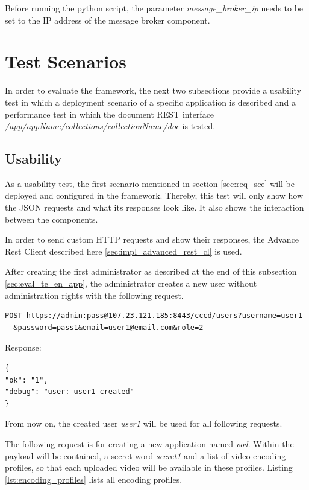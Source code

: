 Before running the python script, the parameter \textit{message\_broker\_ip} needs to be set to the IP address of the message broker component.

\section{Test Scenarios\label{sec:eval__te_sc}}
In order to evaluate the framework, the next two subsections provide a usability test in which a deployment scenario of a specific application is described and a performance test in which the document REST interface \textit{/app/{appName}/collections/{collectionName}/doc} is tested.

\subsection{Usability\label{seq:eval_usab}}
As a usability test, the first scenario mentioned in section \ref{sec:req_sce} will be deployed and configured in the framework. Thereby, this test will only show how the \ac{JSON} requests and what its responses look like. It also shows the interaction between the components.

In order to send custom \ac{HTTP} requests and show their responses, the Advance Rest Client described here \ref{sec:impl_advanced_rest_cl} is used.

After creating the first administrator as described at the end of this subsection \ref{sec:eval_te_en_app}, the administrator creates a new user without administration rights with the following request.
\begin{code}
\begin{verbatim}
POST https://admin:pass@107.23.121.185:8443/cccd/users?username=user1
  &password=pass1&email=user1@email.com&role=2
\end{verbatim}
Response:
\begin{verbatim}
{
"ok": "1",
"debug": "user: user1 created"
}
\end{verbatim}
\end{code}

From now on, the created user \textit{user1} will be used for all following requests.

The following request is for creating a new application named \textit{vod}. Within the payload will be contained, a secret word \textit{secret1} and a list of video encoding profiles, so that each uploaded video will be available in these profiles. Listing \ref{lst:encoding_profiles} lists all encoding profiles.

